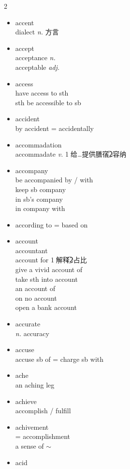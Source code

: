\documentclass[../../book.tex]{subfiles}
\begin{document}
\begin{multicols}{2}
\begin{itemize}
\\academy \emph{n.} 研究所，学院
\item[-] accent
\\{\color{violet}dialect \emph{n.} 方言}
\item[-] accept
\\acceptance \emph{n.}
\\acceptable \emph{adj.}
\item[-] access
\\have access to sth
\\sth be accessible to sb
\\\phantom{sth be }{$\downarrow$\scriptsize 可达的；易懂的；平易近人的；可使用的}
\item[-] accident
\\by accident = accidentally
\item[-] accommadation
\\accommadate \emph{v.} \textcircled{1}给\ldots 提供膳宿\textcircled{2}容纳
\item[-] accompany
\\be accompanied by / with
\\keep sb company
\\in sb\textquoteright s company
\\in company with
\item[-] according to
= based on
\item[-] account
\\accountant
\\account for \textcircled{1}解释\textcircled{2}占比
\\give a vivid account of
\\take sth into account
\\an account of
\\on no account
\\open a bank account
\item[-] accurate
\\\emph{n.} accuracy
\item[-] accuse
\\accuse sb of = charge sb with
\item[-] ache
\\an aching leg
\item[-] achieve
\\accomplish / fulfill
\item[-] achivement
\\= accomplishment
\\a sense of $\sim$
\item[-] acid

\end{itemize}
\end{multicols}
\end{document}
